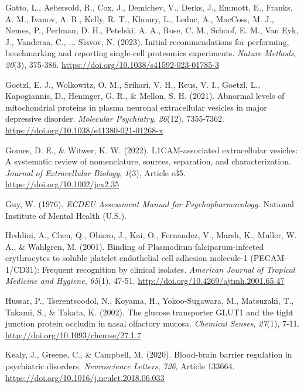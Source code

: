 \documentclass[authordate, empirical, issue]{jote-new-article}
\begin{document}
	Gatto, L., Aebersold, R., Cox, J., Demichev, V., Derks, J., Emmott, E., Franks, A. M., Ivanov, A. R., Kelly, R. T., Khoury, L., Leduc, A., MacCoss, M. J., Nemes, P., Perlman, D. H., Petelski, A. A., Rose, C. M., Schoof, E. M., Van Eyk, J., Vanderaa, C., ... Slavov, N. (2023). Initial recommendations for performing, benchmarking and reporting single-cell proteomics experiments. \emph{Nature Methods},\emph{ 20}(3), 375-386. \url{https://doi.org/10.1038/s41592-023-01785-3}



	Goetzl, E. J., Wolkowitz, O. M., Srihari, V. H., Reus, V. I., Goetzl, L., Kapogiannis, D., Heninger, G. R., \& Mellon, S. H. (2021). Abnormal levels of mitochondrial proteins in plasma neuronal extracellular vesicles in major depressive disorder. \emph{Molecular Psychiatry},\emph{ 26}(12), 7355-7362. \url{https://doi.org/10.1038/s41380-021-01268-x}



	Gomes, D. E., \& Witwer, K. W. (2022). L1CAM-associated extracellular vesicles: A systematic review of nomenclature, sources, separation, and characterization. \emph{Journal of Extracellular Biology},\emph{ 1}(3), Article e35. \url{https://doi.org/10.1002/jex2.35}



	Guy, W. (1976). \emph{ECDEU Assessment Manual for Psychopharmacology. }National Institute of Mental Health (U.S.).



	Heddini, A., Chen, Q., Obiero, J., Kai, O., Fernandez, V., Marsh, K., Muller, W. A., \& Wahlgren, M. (2001). Binding of Plasmodium falciparum-infected erythrocytes to soluble platelet endothelial cell adhesion molecule-1 (PECAM-1/CD31): Frequent recognition by clinical isolates. \emph{American Journal of Tropical Medicine and Hygiene},\emph{ 65}(1), 47-51. \url{http://doi.org/10.4269/ajtmh.2001.65.47}



	Hussar, P., Tserentsoodol, N., Koyama, H., Yokoo-Sugawara, M., Matsuzaki, T., Takami, S., \& Takata, K. (2002). The glucose transporter GLUT1 and the tight junction protein occludin in nasal olfactory mucosa. \emph{Chemical Senses},\emph{ 27}(1), 7-11. \url{http://doi.org/10.1093/chemse/27.1.7} 
	
	Kealy, J., Greene, C., \& Campbell, M. (2020). Blood-brain barrier regulation in psychiatric disorders. \emph{Neuroscience Letters},\emph{ 726}, Article 133664. \url{https://doi.org/10.1016/j.neulet.2018.06.033}
\end{document}

